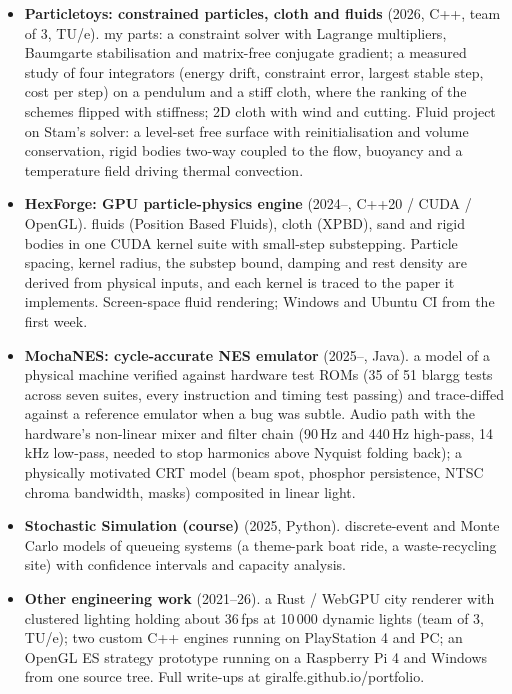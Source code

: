 \documentclass[10pt,a4paper]{article}
\newcommand{\proj}[3]{\item \textbf{#1} \textcolor{muted}{(#2).} #3}
\begin{document}
\begin{itemize}
\proj{Particletoys: constrained particles, cloth and fluids}{2026, C++, team of 3, TU/e}{my parts: a constraint solver with Lagrange multipliers, Baumgarte stabilisation and matrix-free conjugate gradient; a measured study of four integrators (energy drift, constraint error, largest stable step, cost per step) on a pendulum and a stiff cloth, where the ranking of the schemes flipped with stiffness; 2D cloth with wind and cutting. Fluid project on Stam's solver: a level-set free surface with reinitialisation and volume conservation, rigid bodies two-way coupled to the flow, buoyancy and a temperature field driving thermal convection.}
\proj{HexForge: GPU particle-physics engine}{2024--, C++20 / CUDA / OpenGL}{fluids (Position Based Fluids), cloth (XPBD), sand and rigid bodies in one CUDA kernel suite with small-step substepping. Particle spacing, kernel radius, the substep bound, damping and rest density are derived from physical inputs, and each kernel is traced to the paper it implements. Screen-space fluid rendering; Windows and Ubuntu CI from the first week.}
\proj{MochaNES: cycle-accurate NES emulator}{2025--, Java}{a model of a physical machine verified against hardware test ROMs (35 of 51 blargg tests across seven suites, every instruction and timing test passing) and trace-diffed against a reference emulator when a bug was subtle. Audio path with the hardware's non-linear mixer and filter chain (90\,Hz and 440\,Hz high-pass, 14\,kHz low-pass, needed to stop harmonics above Nyquist folding back); a physically motivated CRT model (beam spot, phosphor persistence, NTSC chroma bandwidth, masks) composited in linear light.}
\proj{Stochastic Simulation (course)}{2025, Python}{discrete-event and Monte Carlo models of queueing systems (a theme-park boat ride, a waste-recycling site) with confidence intervals and capacity analysis.}
\proj{Other engineering work}{2021--26}{a Rust / WebGPU city renderer with clustered lighting holding about 36\,fps at 10\,000 dynamic lights (team of 3, TU/e); two custom C++ engines running on PlayStation 4 and PC; an OpenGL ES strategy prototype running on a Raspberry Pi 4 and Windows from one source tree. Full write-ups at giralfe.github.io/portfolio.}
\end{itemize}

\end{document}
